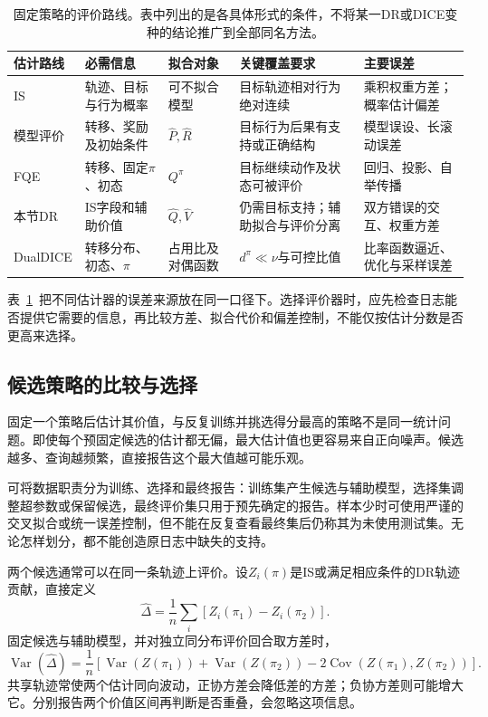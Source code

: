 \begin{table}[htbp]
  \centering
  \small
  \begin{tabularx}{\linewidth}{p{17mm}XXXX}
    \toprule
    估计路线 & 必需信息 & 拟合对象 & 关键覆盖要求 & 主要误差 \\
    \midrule
    IS & 轨迹、目标与行为概率 & 可不拟合模型 & 目标轨迹相对行为绝对连续 & 乘积权重方差；概率估计偏差 \\
    模型评价 & 转移、奖励及初始条件 & $\widehat P,\widehat R$ & 目标行为后果有支持或正确结构 & 模型误设、长滚动误差 \\
    FQE & 转移、固定$\pi$、初态 & $Q^\pi$ & 目标继续动作及状态可被评价 & 回归、投影、自举传播 \\
    本节DR & IS字段和辅助价值 & $\widehat Q,\widehat V$ & 仍需目标支持；辅助拟合与评价分离 & 双方错误的交互、权重方差 \\
    DualDICE & 转移分布、初态、$\pi$ & 占用比及对偶函数 & $d^\pi\ll\nu$与可控比值 & 比率函数逼近、优化与采样误差 \\
    \bottomrule
  \end{tabularx}
  \caption{固定策略的评价路线。表中列出的是各具体形式的条件，不将某一DR或DICE变种的结论推广到全部同名方法。}
  \label{tab:rl-information-estimators}
\end{table}

表~\ref{tab:rl-information-estimators}~把不同估计器的误差来源放在同一口径下。选择评价器时，应先检查日志能否提供它需要的信息，再比较方差、拟合代价和偏差控制，不能仅按估计分数是否更高来选择。

\subsection{候选策略的比较与选择}
\label{sec:rl-information-selection}

固定一个策略后估计其价值，与反复训练并挑选得分最高的策略不是同一统计问题。即使每个预固定候选的估计都无偏，最大估计值也更容易来自正向噪声。候选越多、查询越频繁，直接报告这个最大值越可能乐观。

可将数据职责分为训练、选择和最终报告：训练集产生候选与辅助模型，选择集调整超参数或保留候选，最终评价集只用于预先确定的报告。样本少时可使用严谨的交叉拟合或统一误差控制，但不能在反复查看最终集后仍称其为未使用测试集。无论怎样划分，都不能创造原日志中缺失的支持。

两个候选通常可以在同一条轨迹上评价。设$Z_i(\pi)$是IS或满足相应条件的DR轨迹贡献，直接定义
\begin{equation}
  \label{eq:rl-information-paired}
  \widehat\Delta=\frac1n\sum_i[Z_i(\pi_1)-Z_i(\pi_2)].
\end{equation}
固定候选与辅助模型，并对独立同分布评价回合取方差时，
\[
  \operatorname{Var}(\widehat\Delta)
  =\frac1n\left[
    \operatorname{Var}(Z(\pi_1))+\operatorname{Var}(Z(\pi_2))
    -2\operatorname{Cov}(Z(\pi_1),Z(\pi_2))\right].
\]
共享轨迹常使两个估计同向波动，正协方差会降低差的方差；负协方差则可能增大它。分别报告两个价值区间再判断是否重叠，会忽略这项信息。

